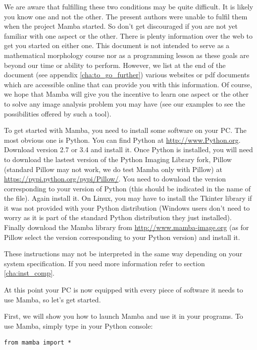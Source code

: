 \documentclass[a4paper,10pt,oneside]{article}
\begin{document}
We are aware that fulfilling these two conditions may be quite difficult. It is 
likely you know one and not the other. The present authors were unable to 
fulfil them when the project Mamba started. So don't get discouraged if you are
not yet familiar with one aspect or the other. There is plenty information over
the web to get you started on either one. This document is not intended to serve
as a mathematical morphology course nor as a programming lesson as these goals are
beyond our time or ability to perform. However, we list at the end of the
document (see appendix \ref{cha:to_go_further}) various websites or pdf documents which are 
accessible online that can provide you with this information. Of course, we hope that
Mamba will give you the incentive to learn one aspect or the other to solve
any image analysis problem you may have (see our examples to see the 
possibilities offered by such a tool).

To get started with Mamba, you need to install some software on your PC. The 
most obvious one is Python. You can find Python at \url{http://www.Python.org}. 
Download version 2.7 or 3.4 and install it. Once Python is installed, you will
need to download the lastest version of the Python Imaging Library fork, Pillow
(standard Pillow may not work, we do test Mamba only with Pillow) at 
\url{https://pypi.python.org/pypi/Pillow/}.
You need to download the version corresponding to your version of Python (this
should be indicated in the name of the file). Again install it. On Linux, you may
have to install the Tkinter library if it was not provided with your Python
distribution (Windows users don't need to worry as it is part of the standard 
Python distribution they just installed). Finally download the Mamba library 
from \url{http://www.mamba-image.org} (as for Pillow select the version corresponding
to your Python version) and install it.

These instructions may not be interpreted in the same way depending on your 
system specification. If you need more information refer to section
\ref{cha:inst_comp}.

At this point your PC is now equipped with every piece of software it needs to
use Mamba, so let's get started.

First, we will show you how to launch Mamba and use it in your programs.
To use Mamba, simply type in your Python console:

\lstset{language=Python}
\begin{lstlisting}
from mamba import * 
\end{lstlisting}
\end{document}
